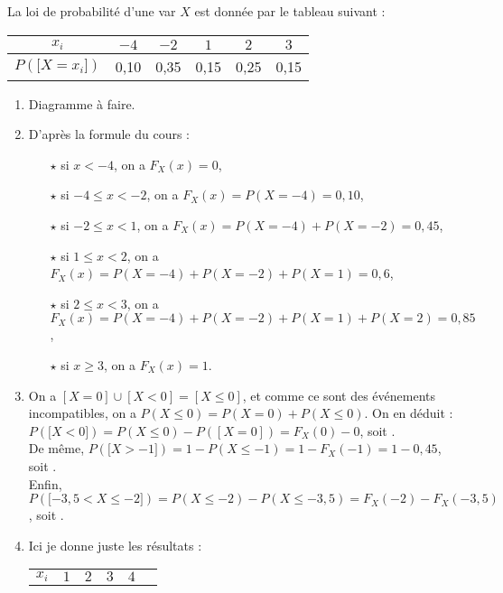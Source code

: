 \documentclass[a4paper, 11pt,reqno]{article}
\begin{document}
\begin{correction}  \;
	La loi de probabilit\'e d'une var $X$ est donn\'ee par le tableau
	suivant :\\\begin{center} \begin{tabular}{|c|c|c|c|c|c|} \hline $x_i$     & $-4$ & $-2$ & $1$  & $2$  & $3$  \\
               \hline $P(\lbrack X=x_i\rbrack)$ & 0,10 & 0,35 & 0,15 & 0,25 & 0,15
               \\ \hline
		\end{tabular} \end{center}
	\begin{enumerate}
		\item Diagramme \`a faire.%
		\item D'apr\`es la formule du cours :
		      \begin{itemize}
			      \item[$\star$] si $x<-4$, on a $F_X(x) = 0$,
			      \item[$\star$] si $-4\leq x < -2$, on a $F_X(x) = P(X =-4) = 0,10$,
			      \item[$\star$] si $-2\leq x < 1$, on a $F_X(x) = P(X=-4)+P(X=-2) = 0,45$,
			      \item[$\star$] si $1\leq x < 2$, on a $F_X(x) =  P(X=-4)+P(X=-2)+P(X=1) = 0,6$,
			      \item[$\star$] si $2\leq x < 3$, on a $F_X(x) = P(X=-4)+P(X=-2)+P(X=1) +P(X=2)=0,85$,
			      \item[$\star$] si $x\geq 3$, on a $F_X(x) = 1$.
		      \end{itemize}
		\item On a $[X=0]\cup[X<0] = [X\leq0]$, et comme ce sont des \'ev\'enements incompatibles, on a $P(X\leq0) = P(X=0) + P(X\leq0)$. On en d\'eduit : $P(\lbrack X<0\rbrack) = P(X\leq0) - P([X=0]) = F_X(0) - 0$, soit .\\
		      De m\^eme, $P(\lbrack X> -1\rbrack ) = 1- P(X\leq -1) = 1-F_X(-1) = 1-0,45$, soit .\\
		      Enfin, $P(\lbrack -3,5<X\leq -2\rbrack) = P(X\leq -2) - P(X\leq -3,5) = F_X(-2) - F_X(-3,5)$, soit .
		\item Ici je donne juste les r\'esultats :
		      \begin{center} \begin{tabular}{|c|c|c|c|c|c|} \hline $x_i$       & $1$  & $2$  & $3$  & $4$  \\

\end{tabular}
\end{center}
\end{enumerate}
\end{correction}
\end{document}
